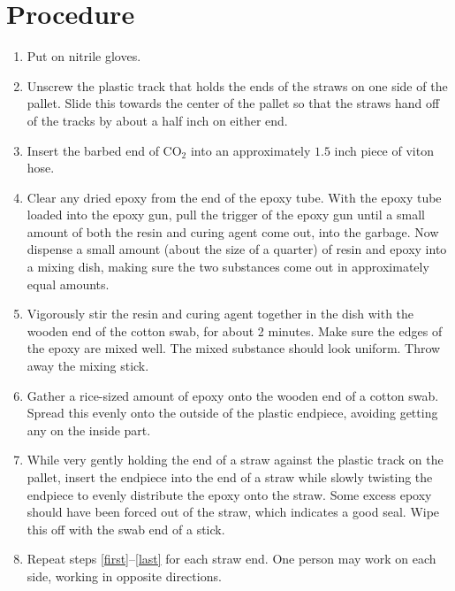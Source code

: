 \documentclass[letterpaper,12pt]{article}
\begin{document}
\section{Procedure}
\begin{enumerate}
\item Put on nitrile gloves. \label{first}

\item Unscrew the plastic track that holds the ends of the straws on one side of the pallet. Slide this towards the center of the pallet so that the straws hand off of the tracks by about a half inch on either end.

\item Insert the barbed end of CO$_2$ into an approximately $1.5$ inch piece of viton hose.
%
\item Clear any dried epoxy from the end of the epoxy tube. With the epoxy tube loaded into the epoxy gun, pull the trigger of the epoxy gun until a small amount of both the resin and curing agent come out, into the garbage. Now dispense a small amount (about the size of a quarter) of resin and epoxy into a mixing dish, making sure the two substances come out in approximately equal amounts.
%
\item Vigorously stir the resin and curing agent together in the dish with the wooden end of the cotton swab, for about 2 minutes. Make sure the edges of the epoxy are mixed well. The mixed substance should look uniform. Throw away the mixing stick.
%
\item Gather a rice-sized amount of epoxy onto the wooden end of a cotton swab. Spread this evenly onto the outside of the plastic endpiece, avoiding getting any on the inside part.
%
\item While very gently holding the end of a straw against the plastic track on the pallet, insert the endpiece into the end of a straw while slowly twisting the endpiece to evenly distribute the epoxy onto the straw. Some excess epoxy should have been forced out of the straw, which indicates a good seal. Wipe this off with the swab end of a stick. \label{last}
%
\item Repeat steps \ref{first}--\ref{last} for each straw end. One person may work on each side, working in opposite directions.
\end{enumerate}

\newpage
\end{document}

